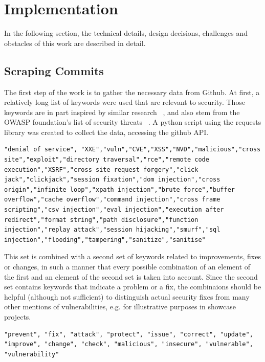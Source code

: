 \documentclass[
	a4paper,
	pagesize,
	pdftex,
	12pt,
	twoside, %
	BCOR=5mm, %
	ngerman,
	fleqn,
	final,
	]{scrartcl}
\begin{document}
\newpage
\section{Implementation}
In the following section, the technical details, design decisions, challenges and obstacles of this work are described in detail.

\subsection{Scraping Commits}
The first step of the work is to gather the necessary data from Github. At first, a relatively long list of keywords were used that are relevant to security. Those keywords are in part inspired by similar research ~\cite{Zhou.2017}, and also stem from the OWASP foundation's list of security threats ~\cite{OWASPFoundation.}. A python script using the requests library was created to collect the data, accessing the github API. 

\lstset{basicstyle=\small}
\begin{lstlisting}
"denial of service", "XXE","vuln","CVE","XSS","NVD","malicious","cross site","exploit","directory traversal","rce","remote code execution","XSRF","cross site request forgery","click jack","clickjack","session fixation","dom injection","cross origin","infinite loop","xpath injection","brute force","buffer overflow","cache overflow","command injection","cross frame scripting","csv injection","eval injection","execution after redirect","format string","path disclosure","function injection","replay attack","session hijacking","smurf","sql injection","flooding","tampering","sanitize","sanitise"
\end{lstlisting}

This set is combined with a second set of keywords related to improvements, fixes or changes, in such a manner that every possible combination of an element of the first and an element of the second set is taken into account. Since the second set contains keywords that indicate a problem or a fix, the combinaions should be helpful (although not sufficient) to distinguish actual security fixes from many other mentions of vulnerabilities, e.g. for illustrative purposes in showcase projects.

\begin{lstlisting}
"prevent", "fix", "attack", "protect", "issue", "correct", "update", "improve", "change", "check", "malicious", "insecure", "vulnerable", "vulnerability"
\end{lstlisting}
\end{document}
